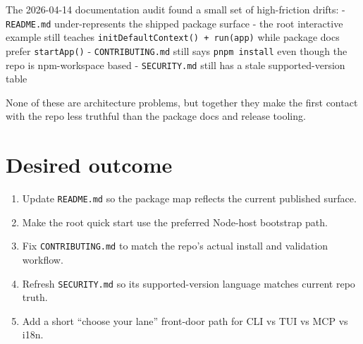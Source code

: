 The 2026-04-14 documentation audit found a small set of high-friction drifts: - \texttt{R\allowbreak{}E\allowbreak{}A\allowbreak{}D\allowbreak{}M\allowbreak{}E\allowbreak{}.\allowbreak{}m\allowbreak{}d} under-represents the shipped package surface - the root interactive example still teaches \texttt{i\allowbreak{}n\allowbreak{}i\allowbreak{}t\allowbreak{}D\allowbreak{}e\allowbreak{}f\allowbreak{}a\allowbreak{}u\allowbreak{}l\allowbreak{}t\allowbreak{}C\allowbreak{}o\allowbreak{}n\allowbreak{}t\allowbreak{}e\allowbreak{}x\allowbreak{}t\allowbreak{}(\allowbreak{})\allowbreak{} \allowbreak{}+\allowbreak{} \allowbreak{}r\allowbreak{}u\allowbreak{}n\allowbreak{}(\allowbreak{}a\allowbreak{}p\allowbreak{}p\allowbreak{})} while package docs prefer \texttt{s\allowbreak{}t\allowbreak{}a\allowbreak{}r\allowbreak{}t\allowbreak{}A\allowbreak{}p\allowbreak{}p\allowbreak{}(\allowbreak{})} - \texttt{C\allowbreak{}O\allowbreak{}N\allowbreak{}T\allowbreak{}R\allowbreak{}I\allowbreak{}B\allowbreak{}U\allowbreak{}T\allowbreak{}I\allowbreak{}N\allowbreak{}G\allowbreak{}.\allowbreak{}m\allowbreak{}d} still says \texttt{p\allowbreak{}n\allowbreak{}p\allowbreak{}m\allowbreak{} \allowbreak{}i\allowbreak{}n\allowbreak{}s\allowbreak{}t\allowbreak{}a\allowbreak{}l\allowbreak{}l} even though the repo is npm-workspace based - \texttt{S\allowbreak{}E\allowbreak{}C\allowbreak{}U\allowbreak{}R\allowbreak{}I\allowbreak{}T\allowbreak{}Y\allowbreak{}.\allowbreak{}m\allowbreak{}d} still has a stale supported-version table

None of these are architecture problems, but together they make the first contact with the repo less truthful than the package docs and release tooling.

\section{Desired outcome}\label{record-334-desired-outcome}

\begin{enumerate}
\def\labelenumi{\arabic{enumi}.}
\tightlist
\item
  Update \texttt{R\allowbreak{}E\allowbreak{}A\allowbreak{}D\allowbreak{}M\allowbreak{}E\allowbreak{}.\allowbreak{}m\allowbreak{}d} so the package map reflects the current published surface.
\item
  Make the root quick start use the preferred Node-host bootstrap path.
\item
  Fix \texttt{C\allowbreak{}O\allowbreak{}N\allowbreak{}T\allowbreak{}R\allowbreak{}I\allowbreak{}B\allowbreak{}U\allowbreak{}T\allowbreak{}I\allowbreak{}N\allowbreak{}G\allowbreak{}.\allowbreak{}m\allowbreak{}d} to match the repo's actual install and validation workflow.
\item
  Refresh \texttt{S\allowbreak{}E\allowbreak{}C\allowbreak{}U\allowbreak{}R\allowbreak{}I\allowbreak{}T\allowbreak{}Y\allowbreak{}.\allowbreak{}m\allowbreak{}d} so its supported-version language matches current repo truth.
\item
  Add a short ``choose your lane'' front-door path for CLI vs TUI vs MCP vs i18n.
\end{enumerate}

